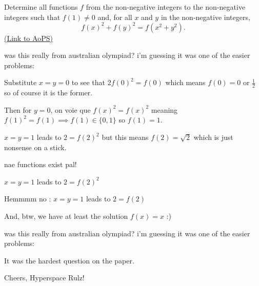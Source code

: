 \begin{problem}
	Determine all functions $f$ from the non-negative integers to the non-negative integers such that $f(1)\neq0$ and, for all $x$ and $y$ in the non-negative integers,
\[f(x)^2+f(y)^2=f(x^2+y^2).\]
	\flushright \href{https://artofproblemsolving.com/community/c6h405598}{(Link to AoPS)}
\end{problem}



\begin{solution}
	was this really from australian olympiad? i'm guessing it was one of the easier problems:

Substitute $x=y=0$ to see that $2f(0)^2=f(0)$ which means $f(0)=0$ or $\frac{1}{2}$ so of course it is the former.

Then for $y=0$, on voie que $f(x)^2=f(x)^2$ meaning $f(1)^2=f(1)\implies f(1)\in\{0,1\}$ so $f(1)=1$.

$x=y=1$ leads to $2=f(2)^2$ but this means $f(2)=\sqrt{2}$ which is just nonsense on a stick.

nae functions exist pal!
\end{solution}



\begin{solution}
	\begin{tcolorbox}$x=y=1$ leads to $2=f(2)^2$ \end{tcolorbox}

Hemmmm no : $x=y=1$ leads to $2=f(2)$

And, btw, we have at least the solution $f(x)=x$ :)
\end{solution}



\begin{solution}
	\begin{tcolorbox}was this really from australian olympiad? i'm guessing it was one of the easier problems:
\end{tcolorbox}

It was the hardest question on the paper.

Cheers,
Hyperspace Rulz!
\end{solution}



